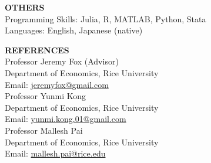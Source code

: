 \documentclass[10pt]{article}
\begin{document}
\vspace{10pt}

\textbf{OTHERS} \\
Programming Skills: Julia, R, MATLAB, Python, Stata \\
Languages: English, Japanese (native)

\vspace{10pt}

\textbf{REFERENCES} \\
Professor Jeremy Fox (Advisor) \\
Department of Economics, Rice University \\
Email: \href{mailto:jeremyfox@gmail.com}{jeremyfox@gmail.com} \\

Professor Yunmi Kong \\
Department of Economics, Rice University \\
Email: \href{mailto:yunmi.kong.01@gmail.com}{yunmi.kong.01@gmail.com} \\

Professor Mallesh Pai \\
Department of Economics, Rice University \\
Email: \href{mailto:mallesh.pai@rice.edu}{mallesh.pai@rice.edu}
\end{document}
